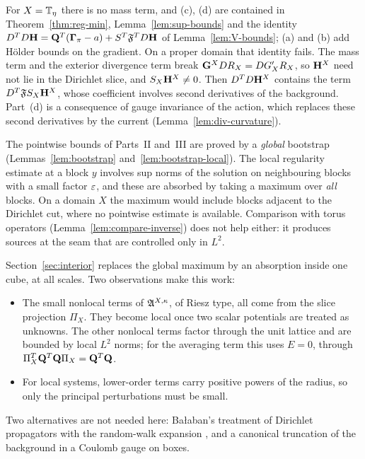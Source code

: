 For $X=\mathbb T_\eta$ there is no mass term, and (c), (d) are contained in Theorem~\ref{thm:reg-min}, Lemma~\ref{lem:sup-bounds} and the identity $D^TD\mathbf H=\mathbf Q^T(\boldsymbol\Gamma_\pi-a)+S^T\mathfrak F^TD\mathbf H$ of Lemma~\ref{lem:V-bounds}; (a) and (b) add H\"older bounds on the gradient. On a proper domain that identity fails. The mass term and the exterior divergence term break $\mathbf G^XDR_X=DG'_XR_X$, so $\mathbf H^X$ need not lie in the Dirichlet slice, and $S_X\mathbf H^X\ne0$. Then $D^TD\mathbf H^X$ contains the term $D^T\mathfrak FS_X\mathbf H^X$, whose coefficient involves second derivatives of the background. Part~(d) is a consequence of gauge invariance of the action, which replaces these second derivatives by the current (Lemma~\ref{lem:div-curvature}).

\begin{remark}\label{rem:ID}
The pointwise bounds of Parts~II and~III are proved by a \emph{global} bootstrap (Lemmas~\ref{lem:bootstrap} and~\ref{lem:bootstrap-local}). The local regularity estimate at a block $y$ involves sup norms of the solution on neighbouring blocks with a small factor $\varepsilon$, and these are absorbed by taking a maximum over \emph{all} blocks. On a domain $X$ the maximum would include blocks adjacent to the Dirichlet cut, where no pointwise estimate is available. Comparison with torus operators (Lemma~\ref{lem:compare-inverse}) does not help either: it produces sources at the seam that are controlled only in $L^2$.

Section~\ref{sec:interior} replaces the global maximum by an absorption inside one cube, at all scales. Two observations make this work:
\begin{itemize}
\item The small nonlocal terms of $\mathfrak A^{X,\kappa}$, of Riesz type, all come from the slice projection $\Pi_X$. They become local once two scalar potentials are treated as unknowns. The other nonlocal terms factor through the unit lattice and are bounded by local $L^2$ norms; for the averaging term this uses $E=0$, through $\Pi_X^T\mathbf Q^T\mathbf Q\Pi_X=\mathbf Q^T\mathbf Q$.
\item For local systems, lower-order terms carry positive powers of the radius, so only the principal perturbations must be small.
\end{itemize}
Two alternatives are not needed here: Ba\l aban's treatment of Dirichlet propagators with the random-walk expansion \cite{BalPropI,BalBackground}, and a canonical truncation of the background in a Coulomb gauge on boxes.
\end{remark}
